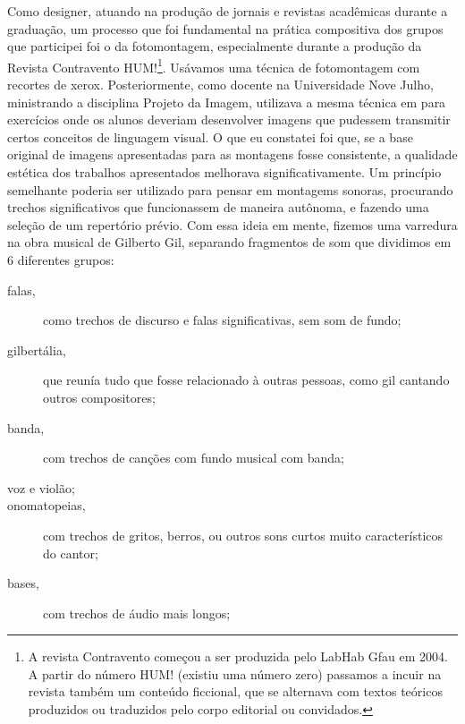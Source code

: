 Como designer, atuando na produção de jornais e revistas acadêmicas durante a graduação, um processo que foi fundamental na prática compositiva dos grupos que participei foi o da fotomontagem, especialmente durante a produção da Revista Contravento HUM!\footnote{A revista Contravento começou a ser produzida pelo LabHab Gfau em 2004. A partir do número HUM! (existiu uma número zero) passamos a incuir na revista também um conteúdo ficcional, que se alternava com  textos teóricos produzidos ou traduzidos pelo corpo editorial ou convidados.}. Usávamos uma técnica de fotomontagem com recortes de xerox. Posteriormente, como docente na Universidade Nove Julho, ministrando a disciplina Projeto da Imagem, utilizava a mesma técnica em para exercícios onde os alunos deveriam desenvolver imagens que pudessem transmitir certos conceitos de linguagem visual. O que eu constatei foi que, se a base original de imagens apresentadas para as montagens fosse consistente, a qualidade estética dos trabalhos apresentados melhorava significativamente. Um princípio semelhante poderia ser utilizado para pensar em montagems sonoras, procurando trechos significativos que funcionassem de maneira autônoma, e fazendo uma seleção de um repertório prévio. Com essa ideia em mente, fizemos uma varredura na obra musical de Gilberto Gil, separando fragmentos de som que dividimos em 6 diferentes grupos: 

\begin{description}
\item[falas,]{ como trechos de discurso e falas significativas, sem som de fundo;
}
\item[gilbertália,]{ que reunía tudo que fosse relacionado à outras pessoas, como gil cantando outros compositores;
}
\item[banda,]{ com trechos de canções com fundo musical com banda;
}
\item[voz e violão;]{}
\item[onomatopeias,]{ com trechos de gritos, berros, ou outros sons curtos muito característicos do cantor;}
\item[bases,]{ com trechos de áudio mais longos; 
}

\end{description}



